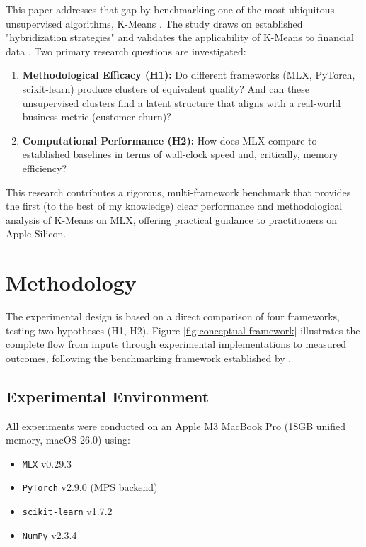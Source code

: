 \documentclass[twocolumn,a4paper]{article}
\begin{document}
This paper addresses that gap by benchmarking one of the most ubiquitous unsupervised algorithms, K-Means \citep{kmeans}. The study draws on established "hybridization strategies" \citep{bose2009} and validates the applicability of K-Means to financial data \citep{tran2023}. Two primary research questions are investigated:
\begin{enumerate}
    \item \textbf{Methodological Efficacy (H1):} Do different frameworks (MLX, PyTorch, scikit-learn) produce clusters of equivalent quality? And can these unsupervised clusters find a latent structure that aligns with a real-world business metric (customer churn)?
    \item \textbf{Computational Performance (H2):} How does MLX compare to established baselines in terms of wall-clock speed and, critically, memory efficiency?
\end{enumerate}
This research contributes a rigorous, multi-framework benchmark that provides the first (to the best of my knowledge) clear performance and methodological analysis of K-Means on MLX, offering practical guidance to practitioners on Apple Silicon.

\section{Methodology}
The experimental design is based on a direct comparison of four frameworks, testing two hypotheses (H1, H2). Figure \ref{fig:conceptual-framework} illustrates the complete flow from inputs through experimental implementations to measured outcomes, following the benchmarking framework established by \citet{bahrampour2016}.

\subsection{Experimental Environment}
All experiments were conducted on an Apple M3 MacBook Pro (18GB unified memory, macOS 26.0) using:
\begin{itemize}
    \item \texttt{MLX} v0.29.3
    \item \texttt{PyTorch} v2.9.0 (MPS backend)
    \item \texttt{scikit-learn} v1.7.2
    \item \texttt{NumPy} v2.3.4
\end{itemize}
\end{document}
